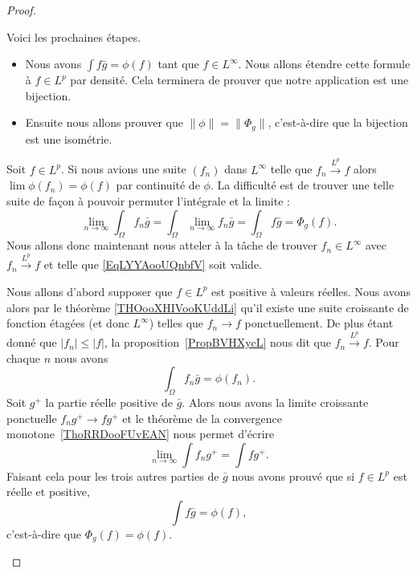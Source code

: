 \begin{proof}
\begin{subproof}

		Voici les prochaines étapes.
		\begin{itemize}
			\item Nous avons \( \int f\bar g=\phi(f)\) tant que \( f\in L^{\infty}\). Nous allons étendre cette formule à \( f\in L^p\) par densité. Cela terminera de prouver que notre application est une bijection.
			\item Ensuite nous allons prouver que \( \| \phi \|=\| \Phi_g \|\), c'est-à-dire que la bijection est une isométrie.
		\end{itemize}

		\spitem[De \( L^{\infty}\) à \( L^p\)]

		Soit \( f\in L^p\). Si nous avions une suite \( (f_n) \) dans \( L^{\infty}\) telle que \( f_n\stackrel{L^p}{\longrightarrow}f\) alors \( \lim \phi(f_n)=\phi(f)\) par continuité de \( \phi\). La difficulté est de trouver une telle suite de façon à pouvoir permuter l'intégrale et la limite :
		\begin{equation}    \label{EqLYYAooUQnbfV}
			\lim_{n\to \infty} \int_{\Omega}f_n\bar g=\int_{\Omega}\lim_{n\to \infty} f_n\bar g=\int_{\Omega}f\bar g=\Phi_g(f).
		\end{equation}
		Nous allons donc maintenant nous atteler à la tâche de trouver \( f_n\in L^{\infty}\) avec \( f_n\stackrel{L^p}{\longrightarrow}f\) et telle que \eqref{EqLYYAooUQnbfV} soit valide.

		Nous allons d'abord supposer que \( f\in L^p\) est positive à valeurs réelles. Nous avons alors par le théorème \ref{THOooXHIVooKUddLi} qu'il existe une suite croissante de fonction étagées (et donc \( L^{\infty}\)) telles que \( f_n\to f\) ponctuellement. De plus étant donné que \( | f_n |\leq | f |\), la proposition~\ref{PropBVHXycL} nous dit que \( f_n\stackrel{L^p}{\longrightarrow}f\). Pour chaque \( n\) nous avons
		\begin{equation}
			\int_{\Omega}f_n\bar g=\phi(f_n).
		\end{equation}
		Soit \( g^+\) la partie réelle positive de \( \bar g\). Alors nous avons la limite croissante ponctuelle \( f_ng^+\to fg^+\) et le théorème de la convergence monotone~\ref{ThoRRDooFUvEAN} nous permet d'écrire
		\begin{equation}
			\lim_{n\to \infty} \int f_ng^+=\int fg^+.
		\end{equation}
		Faisant cela pour les trois autres parties de \( \bar g\) nous avons prouvé que si \( f\in L^p\) est réelle et positive,
		\begin{equation}
			\int f\bar g=\phi(f),
		\end{equation}
		c'est-à-dire que \( \Phi_g(f)=\phi(f)\).


\end{subproof}
\end{proof}
